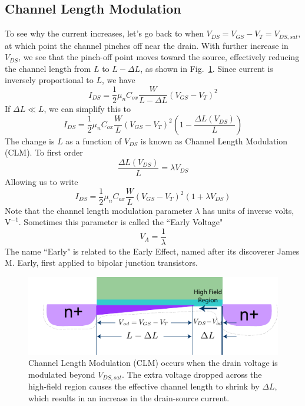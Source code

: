 \subsection{Channel Length Modulation} \label{sec:mos_clm}
To see why the current increases, let's go back to when $V_{DS} = V_{GS} - V_T = V_{DS,sat}$, at which point the channel pinches off near the drain. With further increase in $V_{DS}$, we see that the pinch-off point moves toward the source, effectively reducing the channel length from $L$ to $L-\Delta L$, as shown in Fig.~\ref{fig:mos_current_sat_clm}.  Since current is inversely proportional to $L$, we have
    \begin{equation} 
        I_{DS} = \frac{1}{2}{\mu _n}{C_{ox}}\frac{W}{{L - \Delta L}}{\left( {{V_{GS}} - {V_T}} \right)^2} 
    \end{equation}
If $\Delta L \ll L$, we can simplify this to 
    \begin{equation} 
        I_{DS} = \frac{1}{2}{\mu _n}{C_{ox}}\frac{W}{L}{\left( {{V_{GS}} - {V_T}} \right)^2}  \left(1 - \frac{\Delta L(V_{DS})}{L} \right)
    \end{equation}
The change is $L$ as a function of $V_{DS}$ is known as Channel Length Modulation (CLM).  To first order
    \begin{equation} 
        \frac{\Delta L(V_{DS})}{L} = \lambda V_{DS}
    \end{equation}
Allowing us to write
    \begin{equation} 
        I_{DS} = \frac{1}{2}{\mu _n}{C_{ox}}\frac{W}{L}{\left( {{V_{GS}} - {V_T}} \right)^2}\left( {1 + \lambda {V_{DS}}} \right) 
    \end{equation}
Note that the channel length modulation parameter $\lambda$ has units of inverse volts, $\mathrm{V^{-1}}$.  Sometimes this parameter is called the ``Early Voltage" 
    \begin{equation} 
        V_A = \frac{1}{\lambda}
    \end{equation}
The name ``Early" is related to the Early Effect, named after its discoverer James M. Early, first applied to bipolar junction transistors.  
\begin{figure}[tb]
\centering
\includegraphics[width=.75\columnwidth]{mos_current_sat_clm}
\caption{Channel Length Modulation (CLM) occurs when the drain voltage is modulated beyond $V_{DS,sat}$.  The extra voltage dropped across the high-field region causes the effective channel length to shrink by $\Delta L$, which results in an increase in the drain-source current.}
\label{fig:mos_current_sat_clm}
\end{figure}
